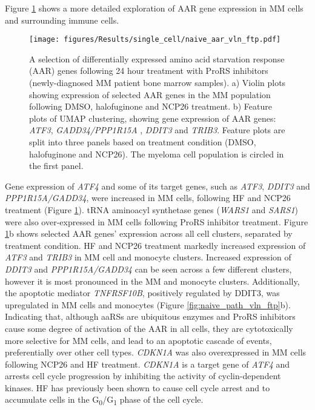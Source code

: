 Figure \ref{fig:naive_aar_vln_ftp} shows a more detailed exploration of AAR gene expression in MM cells and surrounding immune cells.
%
\begin{figure}[htb]
\centering
\texttt{[image: figures/Results/single\_cell/naive\_aar\_vln\_ftp.pdf]}
\caption[Differentially expressed AAR genes- newly diagnosed MM]{A selection of differentially expressed amino acid starvation response (AAR) genes following 24 hour treatment with ProRS inhibitors (newly-diagnosed MM patient bone marrow samples).
    a) Violin plots showing expression of selected AAR genes in the MM population following DMSO, halofuginone and NCP26 treatment.
    b) Feature plots of UMAP clustering, showing gene expression of AAR genes: \textit{ATF3}, \textit{GADD34/PPP1R15A} , \textit{DDIT3} and \textit{TRIB3}.
Feature plots are split into three panels based on treatment condition (DMSO, halofuginone and NCP26).
The myeloma cell population is circled in the first panel.}
\label{fig:naive_aar_vln_ftp}
\end{figure}
Gene expression of \textit{ATF4} and some of its target genes, such as \textit{ATF3}, \textit{DDIT3} and  \textit{PPP1R15A/GADD34}, were increased in MM cells, following HF and NCP26 treatment (Figure \ref{fig:naive_aar_vln_ftp}).
tRNA aminoacyl synthetase genes (\textit{WARS1} and \textit{SARS1}) were also over-expressed in MM cells following ProRS inhibitor treatment.
Figure \ref{fig:naive_aar_vln_ftp}b shows selected AAR genes' expression across all cell clusters, separated by treatment condition.
HF and NCP26 treatment markedly increased expression of \textit{ATF3} and \textit{TRIB3} in MM cell and monocyte clusters.
Increased expression of \textit{DDIT3} and \textit{PPP1R15A/GADD34} can be seen across a few different clusters, however it is most pronounced in the MM and monocyte clusters.
Additionally, the apoptotic mediator \textit{TNFRSF10B}, positively regulated by DDIT3, was upregulated in MM cells and monocytes (Figure \ref{fig:naive_path_vln_ftp}b).
Indicating that, although aaRSs are ubiquitous enzymes and ProRS inhibitors cause some degree of activation of the AAR in all cells, they are cytotoxically more selective for MM cells, and lead to an apoptotic cascade of events, preferentially over other cell types.
\textit{CDKN1A} was also overexpressed in MM cells following NCP26 and HF treatment.
\textit{CDKN1A} is a target gene of \textit{ATF4} and arrests cell cycle progression by inhibiting the activity of cyclin-dependent kinases.
HF has previously been shown to cause cell cycle arrest and to accumulate cells in the G\textsubscript{0}/G\textsubscript{1} phase of the cell cycle.
